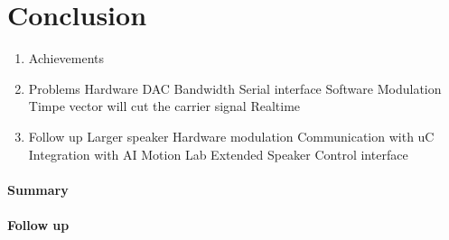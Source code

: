 \chapter{Conclusion}

\begin{enumerate}
  \item Achievements
  \item Problems
  \subitem Hardware
  \subsubitem DAC
  \subsubitem Bandwidth
  \subsubitem Serial interface
  \subitem Software
  \subsubitem Modulation
  \subsubitem Timpe vector will cut the carrier signal
  \subsubitem Realtime
  \item Follow up
  \subitem Larger speaker
  \subitem Hardware modulation
  \subitem Communication with uC
  \subitem Integration with AI Motion Lab
  \subitem Extended Speaker Control interface
\end{enumerate}

\subsubsection*{Summary}

\subsubsection*{Follow up}